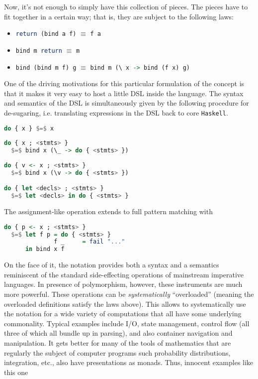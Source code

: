 Now, it's not enough to simply have this collection of pieces. The
pieces have to fit together in a certain way; that is, they are
subject to the following laws:

\begin{itemize}
  \item \lstinline[language=Haskell]!return (bind a f)! $\equiv$ \lstinline[language=Haskell]!f a! %
  \item \lstinline[language=Haskell]!bind m return! $\equiv$ \lstinline[language=Haskell]!m! %
  \item \lstinline[language=Haskell]!bind (bind m f) g! $\equiv$ \lstinline[language=Haskell]!bind m (\ x -> bind (f x) g)! %
\end{itemize}

One of the driving motivations for this particular formulation of the
concept is that it makes it very easy to host a little DSL inside the
language. The syntax and semantics of the DSL is simultaneously given
by the following procedure for de-sugaring, i.e. translating
expressions in the DSL back to core \texttt{Haskell}.

\begin{lstlisting}[language=Haskell,mathescape=true]
do { x } $=$ x
 
do { x ; <stmts> }
  $=$ bind x (\_ -> do { <stmts> })
 
do { v <- x ; <stmts> }
  $=$ bind x (\v -> do { <stmts> }) 

do { let <decls> ; <stmts> }
  $=$ let <decls> in do { <stmts> }
\end{lstlisting} 

The assignment-like operation extends to full pattern matching with

\begin{lstlisting}[language=Haskell,mathescape=true]
  do { p <- x ; <stmts> }
  $=$ let f p = do { <stmts> }
              f _     = fail "..."
      in bind x f
\end{lstlisting}

On the face of it, the notation provides both a syntax and a semantics
reminiscent of the standard side-effecting operations of mainstream
imperative languages. In presence of polymorphism, however, these
instruments are much more powerful. These operations can be
\emph{systematically} ``overloaded'' (meaning the overloaded
definitions satisfy the laws above). This allows to systematically use
the notation for a wide variety of computations that all have some
underlying commonality. Typical examples include I/O, state
management, control flow (all three of which all bundle up in
parsing), and also container navigation and manipulation. It gets
better for many of the tools of mathematics that are regularly the
subject of computer programs such probability distributions,
integration, etc., also have presentations as monads. Thus, innocent
examples like this one

